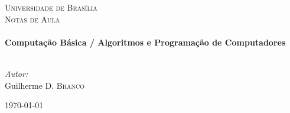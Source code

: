 \documentclass[a4paper, 11pt, twoside]{book}
\begin{document}
	\frontmatter
	
	\begin{titlepage}
		\thispagestyle{empty}
		\center
		
		\textsc{\LARGE Universidade de Brasília}\\[1.5cm] %
		\textsc{\Large Notas de Aula}\\[5cm] %
		
		\HRule \\[0.4cm]
		{\huge \bfseries Computação Básica / Algoritmos e Programação de Computadores}\\[0.4cm]
		\HRule \\[6.5cm]
		
		\begin{minipage}{0.4\textwidth}
			\begin{flushleft} \large
				\emph{Autor:}\\
				Guilherme \textsc{D. Branco} %
			\end{flushleft}
		\end{minipage}
		\vfill
		{\large \today}\\[2cm]
	\end{titlepage}
	
	\restoregeometry
	
	\tableofcontents
	
	\mainmatter
	
	\nocite{*}
	\appendix
	
\end{document}
